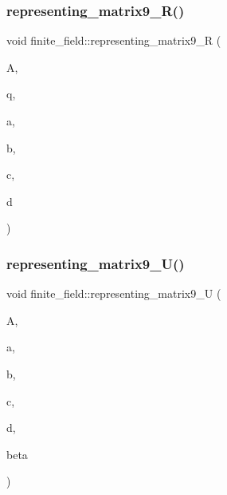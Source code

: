 \mbox{\label{classfinite__field_a8d15d20bbe64970c34f927ca4ecd27ef}} 
\subsubsection{\texorpdfstring{representing\+\_\+matrix9\+\_\+\+R()}{representing\_matrix9\_R()}}
{\footnotesize\ttfamily void finite\+\_\+field\+::representing\+\_\+matrix9\+\_\+R (\begin{DoxyParamCaption}\item[{\mbox{\hyperlink{galois_8h_a09fddde158a3a20bd2dcadb609de11dc}{I\+NT}} $\ast$}]{A,  }\item[{\mbox{\hyperlink{galois_8h_a09fddde158a3a20bd2dcadb609de11dc}{I\+NT}}}]{q,  }\item[{\mbox{\hyperlink{galois_8h_a09fddde158a3a20bd2dcadb609de11dc}{I\+NT}}}]{a,  }\item[{\mbox{\hyperlink{galois_8h_a09fddde158a3a20bd2dcadb609de11dc}{I\+NT}}}]{b,  }\item[{\mbox{\hyperlink{galois_8h_a09fddde158a3a20bd2dcadb609de11dc}{I\+NT}}}]{c,  }\item[{\mbox{\hyperlink{galois_8h_a09fddde158a3a20bd2dcadb609de11dc}{I\+NT}}}]{d }\end{DoxyParamCaption})}

\mbox{\label{classfinite__field_a71554021c854e73fbe656c96cfe48ede}} 
\subsubsection{\texorpdfstring{representing\+\_\+matrix9\+\_\+\+U()}{representing\_matrix9\_U()}}
{\footnotesize\ttfamily void finite\+\_\+field\+::representing\+\_\+matrix9\+\_\+U (\begin{DoxyParamCaption}\item[{\mbox{\hyperlink{galois_8h_a09fddde158a3a20bd2dcadb609de11dc}{I\+NT}} $\ast$}]{A,  }\item[{\mbox{\hyperlink{galois_8h_a09fddde158a3a20bd2dcadb609de11dc}{I\+NT}}}]{a,  }\item[{\mbox{\hyperlink{galois_8h_a09fddde158a3a20bd2dcadb609de11dc}{I\+NT}}}]{b,  }\item[{\mbox{\hyperlink{galois_8h_a09fddde158a3a20bd2dcadb609de11dc}{I\+NT}}}]{c,  }\item[{\mbox{\hyperlink{galois_8h_a09fddde158a3a20bd2dcadb609de11dc}{I\+NT}}}]{d,  }\item[{\mbox{\hyperlink{galois_8h_a09fddde158a3a20bd2dcadb609de11dc}{I\+NT}}}]{beta }\end{DoxyParamCaption})}

